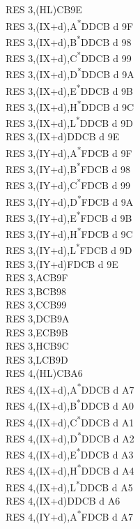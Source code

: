 \documentclass[oneside,a4paper]{book}
\begin{document}
\begin{multicols}{3}
{\begin{tabbing}
RES 3,(HL)\>CB9E\\
RES 3,(IX+d),A\textsuperscript{*}\>DDCB d 9F\\
RES 3,(IX+d),B\textsuperscript{*}\>DDCB d 98\\
RES 3,(IX+d),C\textsuperscript{*}\>DDCB d 99\\
RES 3,(IX+d),D\textsuperscript{*}\>DDCB d 9A\\
RES 3,(IX+d),E\textsuperscript{*}\>DDCB d 9B\\
RES 3,(IX+d),H\textsuperscript{*}\>DDCB d 9C\\
RES 3,(IX+d),L\textsuperscript{*}\>DDCB d 9D\\
RES 3,(IX+d)\>DDCB d 9E\\
RES 3,(IY+d),A\textsuperscript{*}\>FDCB d 9F\\
RES 3,(IY+d),B\textsuperscript{*}\>FDCB d 98\\
RES 3,(IY+d),C\textsuperscript{*}\>FDCB d 99\\
RES 3,(IY+d),D\textsuperscript{*}\>FDCB d 9A\\
RES 3,(IY+d),E\textsuperscript{*}\>FDCB d 9B\\
RES 3,(IY+d),H\textsuperscript{*}\>FDCB d 9C\\
RES 3,(IY+d),L\textsuperscript{*}\>FDCB d 9D\\
RES 3,(IY+d)\>FDCB d 9E\\
RES 3,A\>CB9F\\
RES 3,B\>CB98\\
RES 3,C\>CB99\\
RES 3,D\>CB9A\\
RES 3,E\>CB9B\\
RES 3,H\>CB9C\\
RES 3,L\>CB9D\\
RES 4,(HL)\>CBA6\\
RES 4,(IX+d),A\textsuperscript{*}\>DDCB d A7\\
RES 4,(IX+d),B\textsuperscript{*}\>DDCB d A0\\
RES 4,(IX+d),C\textsuperscript{*}\>DDCB d A1\\
RES 4,(IX+d),D\textsuperscript{*}\>DDCB d A2\\
RES 4,(IX+d),E\textsuperscript{*}\>DDCB d A3\\
RES 4,(IX+d),H\textsuperscript{*}\>DDCB d A4\\
RES 4,(IX+d),L\textsuperscript{*}\>DDCB d A5\\
RES 4,(IX+d)\>DDCB d A6\\
RES 4,(IY+d),A\textsuperscript{*}\>FDCB d A7\\

\end{tabbing}}
\end{multicols}
\end{document}
